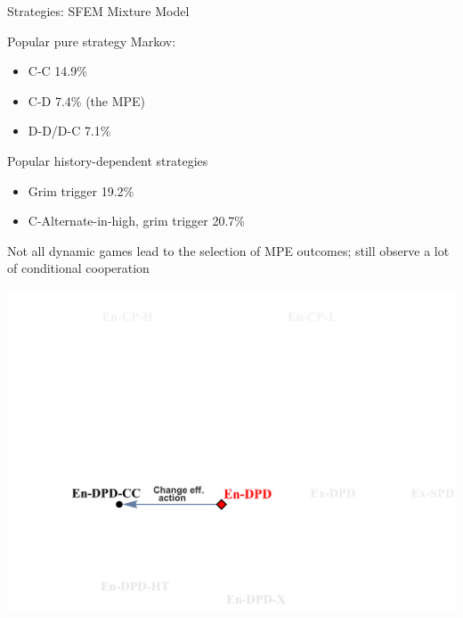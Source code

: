 \documentclass{beamer}
\begin{document}
\begin{frame}{Strategies: SFEM Mixture Model}
\begin{card}
Popular pure strategy Markov:
\begin{itemize}
\item C-C 14.9\%
\item C-D 7.4\% (the MPE)
\item D-D/D-C 7.1\%
\end{itemize}
\end{card}
\begin{card}
 Popular history-dependent strategies
\begin{itemize}
\item Grim trigger 19.2\%
\item C-Alternate-in-high, grim trigger 20.7\%
\end{itemize}
\end{card}
\end{frame}

\begin{frame}
\begin{card}[Result 1]
Not all dynamic games lead to the selection of MPE outcomes;
still observe a lot of conditional cooperation
\end{card}
\end{frame}

\begin{frame}
\begin{card}
\begin{center}\includegraphics[height=0.7\textwidth]{./i/FlowChart2.pdf}
\end{center}
\end{card}
\end{frame}
\end{document}

